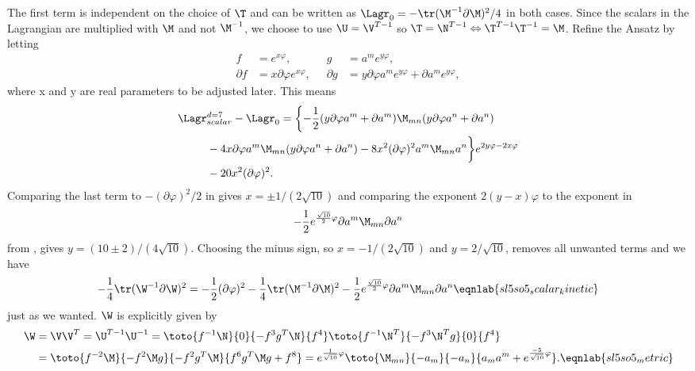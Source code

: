 The first term is independent on the choice of $\T$ and can be written as $\Lagr_0=-\tr(\M^{-1}\partial\M)^2/4$ in both cases. Since the scalars in the Lagrangian  are multiplied with $\M$ and not $\M^{-1}$, we choose to use $\U=\V^{T-1}$ so $\T=\N^{T-1} \Leftrightarrow \T^{T-1}\T^{-1}=\M$.
Refine the Ansatz by letting
\begin{align}
f&=e^{x\varphi},\hspace{1cm} &g&=a^me^{y\varphi},\nonumber\\
\partial f &= x\partial\varphi e^{x\varphi}, &\partial g &=y\partial\varphi a^me^{y\varphi} + \partial a^me^{y\varphi},
\end{align}
where x and y are real parameters to be adjusted later.
This means
\begin{align}
\Lagr&_{scalar}^{d=7}-\Lagr_0 = \left\{-\frac{1}{2}(y\partial\varphi a^m + \partial a^m)\M_{mn}(y\partial\varphi a^n + \partial a^n)\right.\nonumber\\ 
&-4x\partial\varphi a^m\M_{mn}(y\partial\varphi a^n + \partial a^n)-8x^2(\partial\varphi)^2a^m\M_{mn}a^n\bigg\}e^{2y\varphi-2x\varphi}\nonumber\\
&-20x^2(\partial\varphi)^2.
\end{align}
Comparing the last term to $-(\partial\varphi)^2/2$ in  gives $x=\pm 1/(2\sqrt{10})$ and comparing the exponent $2(y-x)\varphi$ to the exponent in 
\begin{align}
-\frac{1}{2}e^{\frac{\sqrt{10}}{2}\varphi}\partial a^m\M_{mn}\partial a^n
\end{align}
from , gives $y=(10\pm 2)/(4\sqrt{10})$. Choosing the minus sign, so $x=-1/(2\sqrt{10})$ and $y=2/\sqrt{10}$, removes all unwanted terms and we have   
\begin{equation}
-\frac{1}{4}\tr(\W^{-1}\partial \W)^2 = -\frac{1}{2}(\partial\varphi)^2-\frac{1}{4}\tr(\M^{-1}\partial \M)^2-\frac{1}{2}e^{\frac{\sqrt{10}}{2}\varphi}\partial a^m\M_{mn}\partial a^n
\eqnlab{sl5so5_scalar_kinetic}
\end{equation}
just as we wanted. $\W$ is explicitly given by
\begin{align}
\W&=\V\V^T = \U^{T-1}\U^{-1} = \toto{f^{-1}\N}{0}{-f^{3}g^T\N}{f^4}\toto{f^{-1}\N^{T}}{-f^{3}\N^{T}g}{0}{f^4}\nonumber\\ 
&= \toto{f^{-2}\M}{-f^{2}\M g}{-f^{2}g^T\M}{f^6g^T\M g+f^8}=e^{\frac{1}{\sqrt{10}}\varphi}\toto{\M_{mn}}{-a_m}{-a_n}{a_m a^m+e^{\frac{-5}{\sqrt{10}}\varphi}}.
\eqnlab{sl5so5_metric}
\end{align}

